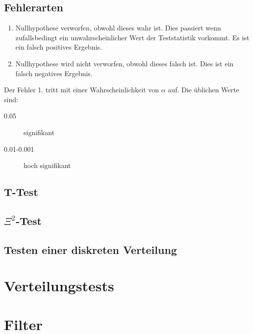 \documentclass[../Main.tex]{subfiles}
\begin{document}
\subsection{Fehlerarten}
\begin{enumerate}
    \item Nullhypothese verworfen, obwohl dieses wahr ist. Dies passiert wenn zufallsbedingt ein unwahrscheinlicher Wert
    der Teststatistik vorkommt. Es ist ein falsch positives Ergebnis.
    \item Nullhypothese wird nicht verworfen, obwohl dieses falsch ist. Dies ist ein falsch negatives Ergebnis.
\end{enumerate}
Der Fehler 1. tritt mit einer Wahrscheinlichkeit von \(\alpha\) auf.
Die üblichen Werte sind:
\begin{description}
    \item[0.05] signifikant
    \item[0.01-0.001] hoch signifikant 
\end{description}

\subsection{T-Test}
\subsection{\(\Xi^2\)-Test}
\subsection{Testen einer diskreten Verteilung}
\subsection{}
\section{Verteilungstests}

\section{Filter}
\end{document}
